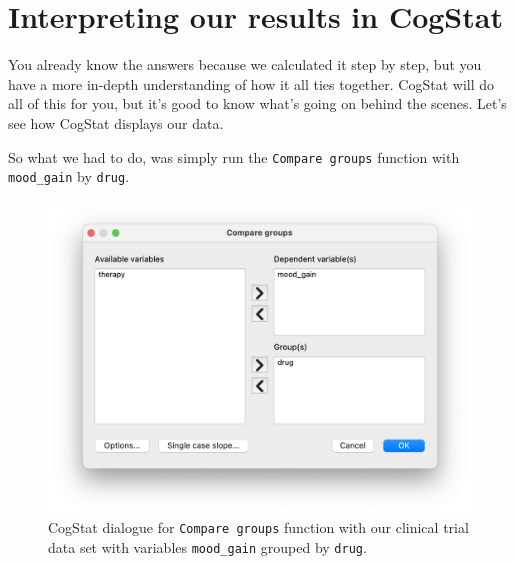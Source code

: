\documentclass[
]{book}
\theoremstyle{definition}
\theoremstyle{definition}
\theoremstyle{definition}
\theoremstyle{definition}
\theoremstyle{remark}
\begin{document}
\hypertarget{introduceaov}{%
\section{Interpreting our results in CogStat}\label{introduceaov}}

You already know the answers because we calculated it step by step, but you have a more in-depth understanding of how it all ties together. CogStat will do all of this for you, but it's good to know what's going on behind the scenes. Let's see how CogStat displays our data.

So what we had to do, was simply run the \texttt{Compare\ groups} function with \texttt{mood\_gain} by \texttt{drug}.



\begin{figure}

{\centering \includegraphics[width=0.66\linewidth]{resources/image/comparegroupsbydrug} 

}

\caption{CogStat dialogue for \texttt{Compare\ groups} function with our clinical trial data set with variables \texttt{mood\_gain} grouped by \texttt{drug}.}\label{fig:cogcompbydrugdialog}
\end{figure}
\end{document}
